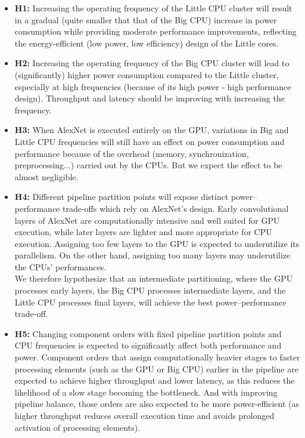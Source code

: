 \documentclass{uva-inf-article}
\begin{document}
\begin{itemize}
    \item \textbf{H1:} Increasing the operating frequency of the Little CPU cluster will result in a gradual (quite smaller that that of the Big CPU) increase in power consumption while providing moderate performance improvements, reflecting the energy-efficient (low power, low efficiency) design of the Little cores.
    
    \item \textbf{H2:} Increasing the operating frequency of the Big CPU cluster will lead to (significantly) higher power consumption compared to the Little cluster, especially at high frequencies (because of its high power - high performance design). Throughput and latency should be improving with increasing the frequency.
    
    \item \textbf{H3:} When AlexNet is executed entirely on the GPU, variations in Big and Little CPU frequencies will still have an effect on power consumption and performance  because of the overhead (memory, synchronization, preprocessing...) carried out by the CPUs. But we expect the effect to be almost negligible. 
    
    \item \textbf{H4:} Different pipeline partition points will expose distinct power--performance trade-offs which rely on AlexNet's design.  Early convolutional layers of AlexNet are computationally intensive and well suited for GPU execution, while later layers are lighter and more appropriate for CPU execution. Assigning too few layers to the GPU is expected to underutilize its parallelism. On the other hand, assigning too many layers may underutilize the CPUs' performances. \\
    We therefore hypothesize that an intermediate partitioning, where the GPU processes early layers, the Big CPU processes intermediate layers, and the Little CPU processes final layers, will achieve the best power--performance trade-off.

    \item \textbf{H5:} Changing component orders with fixed pipeline partition points and CPU frequencies is expected to significantly affect both performance and power. Component orders that assign computationally heavier stages to faster processing elements (such as the GPU or Big CPU) earlier in the pipeline are expected to achieve higher throughput and lower latency, as this reduces the likelihood of a slow stage becoming the bottleneck. And with improving pipeline balance, those orders are also expected to be more power-efficient (as higher throughput reduces overall execution time and avoids prolonged activation of processing elements).


    
\end{itemize}
\end{document}
